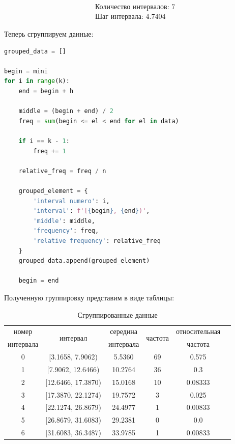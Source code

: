 \documentclass[a4paper, 14pt]{extarticle}
\begin{document}
\vspace{-5pt}

\begin{align*}
    & \text{Количество интервалов: } 7 \\
    & \text{Шаг интервала: }  4.7404
\end{align*}

Теперь сгруппируем данные:

\vspace{10pt}

\begin{lstlisting}[language=Python]
grouped_data = []

begin = mini
for i in range(k):
    end = begin + h

    middle = (begin + end) / 2
    freq = sum(begin <= el < end for el in data)
    
    if i == k - 1:
        freq += 1

    relative_freq = freq / n

    grouped_element = {
        'interval numero': i,
        'interval': f'[{begin}, {end})',
        'middle': middle,
        'frequency': freq,
        'relative frequency': relative_freq
    }
    grouped_data.append(grouped_element)

    begin = end
\end{lstlisting}
\vspace{10pt}
Полученную группировку представим в виде таблицы:
\vspace{10pt}
\begin{table}[h!]
  \centering
  \renewcommand{\arraystretch}{1.5}
  \begin{adjustbox}{max width=0.8\textwidth}
      \begin{tabular}{|c|c|c|c|c|c|}
      \hline
      номер     & \multirow{2}{*}{интервал} & середина  & \multirow{2}{*}{частота} & относительная \\
      интервала &                           & интервала &                          & частота       \\
      \hline
      0 & [3.1658,  7.9062)  & 5.5360  & 69 & 0.575 \\ 
      \hline
      1 & [7.9062,  12.6466) & 10.2764 & 36 & 0.3 \\ 
      \hline
      2 & [12.6466, 17.3870) & 15.0168 & 10 & 0.08333 \\ 
      \hline
      3 & [17.3870, 22.1274) & 19.7572 & 3  & 0.025 \\ 
      \hline
      4 & [22.1274, 26.8679) & 24.4977 & 1  & 0.00833 \\ 
      \hline
      5 & [26.8679, 31.6083) & 29.2381 & 0  & 0.0 \\ 
      \hline
      6 & [31.6083, 36.3487) & 33.9785 & 1  & 0.00833 \\ 
      \hline
      \end{tabular}
  \end{adjustbox}
  \caption{Сгруппированные данные}
  \label{tab:your_table_label}
\end{table}
\end{document}
